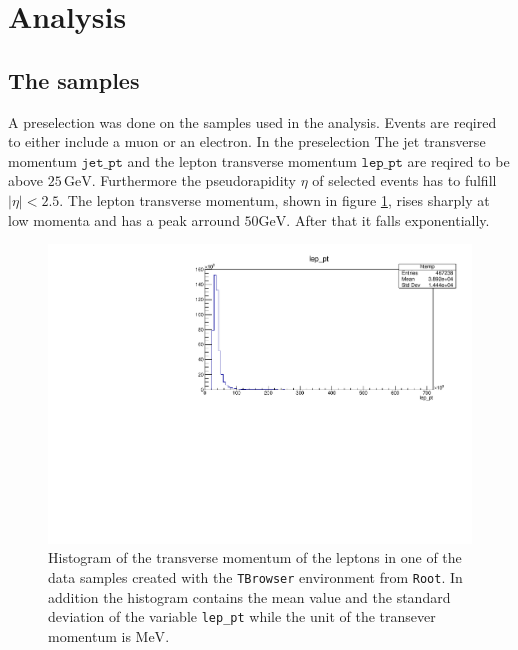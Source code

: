 \section{Analysis}\label{sec:analysis}

\subsection{The samples}
A preselection was done on the samples used in the analysis. Events are reqired to either include a muon or an electron.
In the preselection The jet transverse momentum $\texttt{jet\_pt}$ and the lepton transverse momentum $\texttt{lep\_pt}$
are reqired to be above $25 \, \si{\giga\eV}$.
Furthermore the pseudorapidity $\eta$ of selected events has to fulfill $|\eta| <2.5$.
The lepton transverse momentum, shown in figure \ref{fig:unselected_pt}, rises sharply at low momenta and has a peak arround $50  \si{\giga\eV}$. After that it falls exponentially.

\begin{figure}[tb]
    \centering
    \includegraphics[width=.9\textwidth]{plots/TBrowser_hist.pdf}
    \caption{Histogram of the transverse momentum of the leptons in one of the data samples created with the \texttt{TBrowser} environment from \texttt{Root}. 
    In addition the histogram contains the mean value and the standard deviation of the variable \texttt{lep\_pt} while the unit of the transever momentum is $\si{\mega\eV}$.}
    \label{fig:unselected_pt}
  \end{figure}

